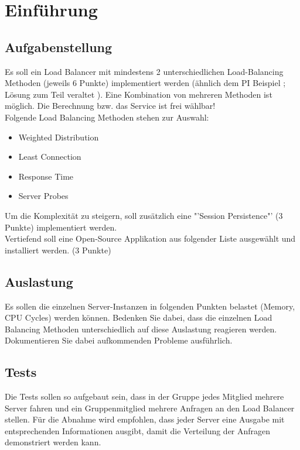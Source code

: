 \documentclass[letterpaper, 12pt]{article}
\let\tempsection\section
\renewcommand\section[1]{\vspace{-0.3cm}\tempsection{#1}\vspace{-0.3cm}}
\let\tempsubsection\subsection
\renewcommand\subsection[1]{\vspace{0cm}\tempsubsection{#1}\vspace{0cm}}
\begin{document}
\parindent 0pt
\parskip 6pt



\clearpage
\thispagestyle{empty}
\tableofcontents

\newpage
{}
\pagestyle{fancy}

\section{Einführung}
\subsection{Aufgabenstellung}
Es soll ein Load Balancer mit mindestens 2 unterschiedlichen Load-Balancing Methoden (jeweils 6 Punkte) implementiert werden (ähnlich dem PI Beispiel \cite{Angabe1}; Lösung zum Teil veraltet \cite{Angabe2}). Eine Kombination von mehreren Methoden ist möglich. Die Berechnung bzw. das Service ist frei wählbar! \\
Folgende Load Balancing Methoden stehen zur Auswahl:
\begin{itemize}
	\item Weighted Distribution
	\item Least Connection
	\item Response Time
	\item Server Probes
\end{itemize}
Um die Komplexität zu steigern, soll zusätzlich eine "'Session Persistence"' (3 Punkte) implementiert werden. \\
Vertiefend soll eine Open-Source Applikation aus folgender Liste ausgewählt und installiert werden. (3 Punkte) \cite{Angabe3}
\subsection{Auslastung}
Es sollen die einzelnen Server-Instanzen in folgenden Punkten belastet (Memory, CPU Cycles) werden können.
Bedenken Sie dabei, dass die einzelnen Load Balancing Methoden unterschiedlich auf diese Auslastung reagieren werden. Dokumentieren Sie dabei aufkommenden Probleme ausführlich.
\subsection{Tests}
Die Tests sollen so aufgebaut sein, dass in der Gruppe jedes Mitglied mehrere Server fahren und ein Gruppenmitglied mehrere Anfragen an den Load Balancer stellen. Für die Abnahme wird empfohlen, dass jeder Server eine Ausgabe mit entsprechenden Informationen ausgibt, damit die Verteilung der Anfragen demonstriert werden kann.
\end{document}
